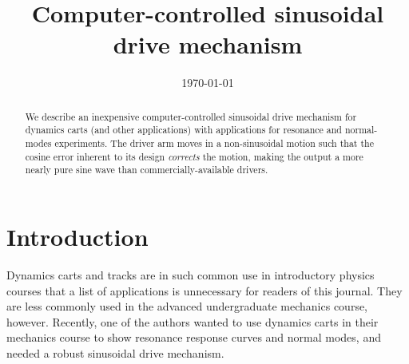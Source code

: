\documentclass[prb,preprint]{revtex4-1}
\begin{document}
\title{Computer-controlled sinusoidal drive mechanism}


\date{\today}

\begin{abstract}
We describe an inexpensive computer-controlled sinusoidal drive mechanism for dynamics carts (and other applications) with applications for resonance and normal-modes experiments.
The driver arm moves in a non-sinusoidal motion such that the cosine error inherent to its design \emph{corrects} the motion, making the output a more nearly pure sine wave than commercially-available drivers.
\end{abstract}

\maketitle

\section{Introduction}

Dynamics carts and tracks are in such common use in introductory physics courses that a list of applications is unnecessary for readers of this journal.
They are less commonly used in the advanced undergraduate mechanics course, however.
Recently, one of the authors wanted to use dynamics carts in their mechanics course to show resonance response curves and normal modes, and needed a robust sinusoidal drive mechanism.
\end{document}

